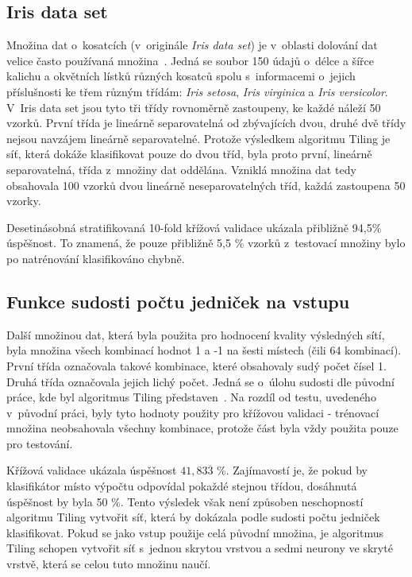 \documentclass[a4paper, 11pt]{article}
\begin{document}
\subsection{Iris data set}\label{iristest}
Množina dat o~kosatcích (v~originále \emph{Iris data set}) je v~oblasti dolování dat velice často používaná množina~\cite{iris}. Jedná se soubor 150 údajů o~délce a šířce kalichu a okvětních lístků různých kosatců spolu s~informacemi o~jejich příslušnosti ke třem různým třídám: \emph{Iris setosa}, \emph{Iris virginica} a \emph{Iris versicolor}. V~Iris data set jsou tyto tři třídy rovnoměrně zastoupeny, ke každé náleží 50 vzorků. První třída je lineárně separovatelná od zbývajících dvou, druhé dvě třídy nejsou navzájem lineárně separovatelné. Protože výsledkem algoritmu Tiling je síť, která dokáže klasifikovat pouze do dvou tříd, byla proto první, lineárně separovatelná, třída z~množiny dat oddělána. Vzniklá množina dat tedy obsahovala 100 vzorků dvou lineárně neseparovatelných tříd, každá zastoupena 50 vzorky.

Desetinásobná stratifikovaná 10-fold křížová validace ukázala přibližně 94{,}5\% úspěšnost. To znamená, že pouze přibližně 5{,}5 \% vzorků z~testovací množiny bylo po natrénování klasifikováno chybně.

\subsection{Funkce sudosti počtu jedniček na vstupu}\label{sudost}
Další množinou dat, která byla použita pro hodnocení kvality výsledných sítí, byla množina všech kombinací hodnot 1 a -1 na šesti místech (čili 64 kombinací). První třída označovala takové kombinace, které obsahovaly sudý počet čísel 1. Druhá třída označovala jejich lichý počet. Jedná se o~úlohu sudosti dle původní práce, kde byl algoritmus Tiling představen~\cite{mezard}. Na rozdíl od testu, uvedeného v~původní práci, byly tyto hodnoty použity pro křížovou validaci - trénovací množina neobsahovala všechny kombinace, protože část byla vždy použita pouze pro testování.

Křížová validace ukázala úspěšnost $41{,}83\overline{3}$ \%. Zajímavostí je, že pokud by klasifikátor místo výpočtu odpovídal pokaždé stejnou třídou, dosáhnutá úspěšnost by byla 50 \%. Tento výsledek však není způsoben neschopností algoritmu Tiling vytvořit síť, která by dokázala podle sudosti počtu jedniček klasifikovat. Pokud se jako vstup použije celá původní množina, je algoritmus Tiling schopen vytvořit síť s~jednou skrytou vrstvou a sedmi neurony ve skryté vrstvě, která se celou tuto množinu naučí.
\end{document}
